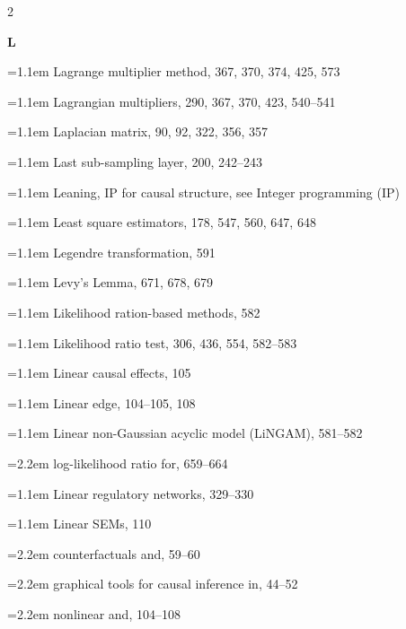 \begin{multicols}{2}
\par{}\medskip\noindent\textbf{L}\par\nobreak\smallskip\nobreak
\noindent\hangindent=1.1em Lagrange multiplier method, 367, 370, 374, 425, 573\par
\noindent\hangindent=1.1em Lagrangian multipliers, 290, 367, 370, 423, 540--541\par
\noindent\hangindent=1.1em Laplacian matrix, 90, 92, 322, 356, 357\par
\noindent\hangindent=1.1em Last sub-sampling layer, 200, 242--243\par
\noindent\hangindent=1.1em Leaning, IP for causal structure, see Integer programming (IP)\par
\noindent\hangindent=1.1em Least square estimators, 178, 547, 560, 647, 648\par
\noindent\hangindent=1.1em Legendre transformation, 591\par
\noindent\hangindent=1.1em Levy's Lemma, 671, 678, 679\par
\noindent\hangindent=1.1em Likelihood ration-based methods, 582\par
\noindent\hangindent=1.1em Likelihood ratio test, 306, 436, 554, 582--583\par
\noindent\hangindent=1.1em Linear causal effects, 105\par
\noindent\hangindent=1.1em Linear edge, 104--105, 108\par
\noindent\hangindent=1.1em Linear non-Gaussian acyclic model (LiNGAM), 581--582\par
\noindent\hangindent=2.2em \hspace*{1.1em}log-likelihood ratio for, 659--664\par
\noindent\hangindent=1.1em Linear regulatory networks, 329--330\par
\noindent\hangindent=1.1em Linear SEMs, 110\par
\noindent\hangindent=2.2em \hspace*{1.1em}counterfactuals and, 59--60\par
\noindent\hangindent=2.2em \hspace*{1.1em}graphical tools for causal inference in, 44--52\par
\noindent\hangindent=2.2em \hspace*{1.1em}nonlinear and, 104--108\par

\end{multicols}
